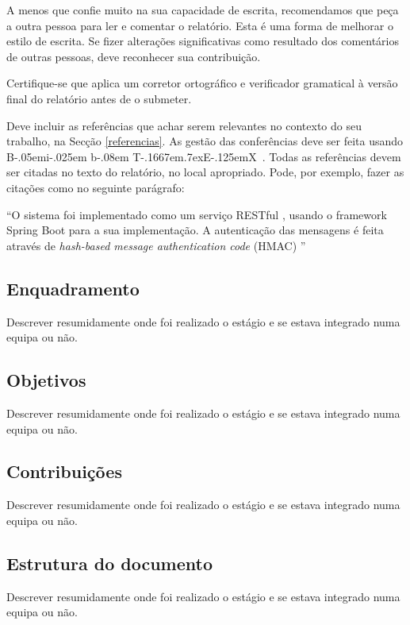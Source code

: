 \documentclass{article}
\def\BibTeX{{\rm B\kern-.05em{\sc i\kern-.025em b}\kern-.08em
    T\kern-.1667em\lower.7ex\hbox{E}\kern-.125emX}}
\begin{document}
A menos que confie muito na sua capacidade de escrita, recomendamos que peça a outra pessoa para ler e comentar o relatório. Esta é uma forma de melhorar o estilo de escrita. Se fizer alterações significativas como resultado dos comentários de outras pessoas, deve reconhecer sua contribuição.

Certifique-se que aplica um corretor ortográfico e verificador gramatical à versão final do relatório antes de o submeter.

Deve incluir as referências que achar serem relevantes no contexto do seu trabalho, na Secção \ref{referencias}. As gestão das conferências deve ser feita usando \BibTeX~\cite{bibtex}. Todas as referências devem ser citadas no texto do relatório, no local apropriado. Pode, por exemplo, fazer as citações como no seguinte parágrafo:

“O sistema foi implementado como um serviço RESTful \cite{richardson2008restful,rodriguez2008restful}, usando o framework Spring Boot \cite{springboot-wikipedia, springboot} para a sua implementação. A autenticação das mensagens é feita através de \emph{hash-based message authentication code} (HMAC) \cite{krawczyk1997hmac, hmac-wikipedia}”

\subsection{Enquadramento}
Descrever resumidamente onde foi realizado o estágio e se estava integrado numa equipa ou não.

\subsection{Objetivos}
Descrever resumidamente onde foi realizado o estágio e se estava integrado numa equipa ou não.

\subsection{Contribuições}
Descrever resumidamente onde foi realizado o estágio e se estava integrado numa equipa ou não.

\subsection{Estrutura do documento}
Descrever resumidamente onde foi realizado o estágio e se estava integrado numa equipa ou não.

\cleardoublepage
\end{document}
